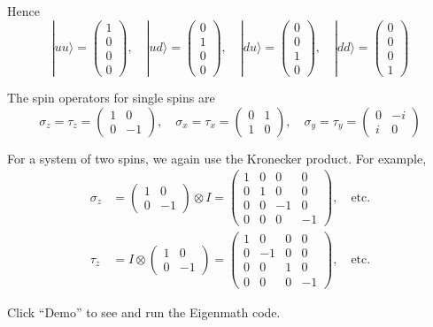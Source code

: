 \documentclass[12pt]{article}
\begin{document}
Hence
\begin{equation*}
|uu\rangle=\begin{pmatrix}1\\0\\0\\0\end{pmatrix},
\quad
|ud\rangle=\begin{pmatrix}0\\1\\0\\0\end{pmatrix},
\quad
|du\rangle=\begin{pmatrix}0\\0\\1\\0\end{pmatrix},
\quad
|dd\rangle=\begin{pmatrix}0\\0\\0\\1\end{pmatrix}
\end{equation*}

The spin operators for single spins are
\begin{equation*}
\sigma_z=\tau_z=\begin{pmatrix}1&0\\0&-1\end{pmatrix},
\quad
\sigma_x=\tau_x=\begin{pmatrix}0&1\\1&0\end{pmatrix},
\quad
\sigma_y=\tau_y=\begin{pmatrix}0&-i\\i&0\end{pmatrix}
\end{equation*}

For a system of two spins, we again use the Kronecker product.
For example,
\begin{align*}
\sigma_z&=\begin{pmatrix}1&0\\0&-1\end{pmatrix}\otimes I
=\begin{pmatrix}1&0&0&0\\0&1&0&0\\0&0&-1&0\\0&0&0&-1\end{pmatrix},\quad\text{etc.}
\\[1ex]
\tau_z&=I\otimes\begin{pmatrix}1&0\\0&-1\end{pmatrix}
=\begin{pmatrix}1&0&0&0\\0&-1&0&0\\0&0&1&0\\0&0&0&-1\end{pmatrix},\quad\text{etc.}
\end{align*}

Click ``Demo'' to see and run the Eigenmath code.
\end{document}
